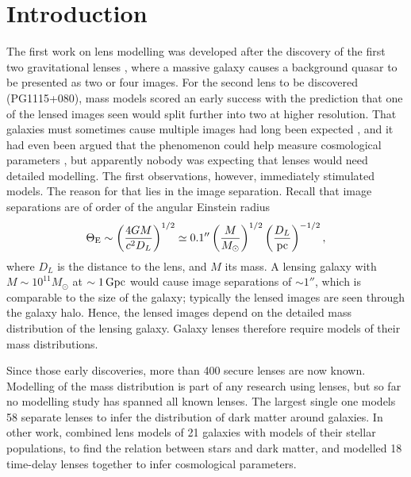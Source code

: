 \documentclass[usenatbib]{mn2e}
\begin{document}
\begin{keywords}
\end{keywords}


\section{Introduction}

The first work on lens modelling
\citep{1981ApJ...244..723Y,1981ApJ...244..736Y} was developed after
the discovery of the first two gravitational lenses
\citep{1979Natur.279..381W,1980Natur.285..641W}, where a massive
galaxy causes a background quasar to be presented as two or four
images.  For the second lens to be discovered (PG1115+080), mass
models scored an early success with the prediction that one of the
lensed images seen would split further into two at higher resolution.
That galaxies must sometimes cause multiple images had long been
expected \citep{1937ApJ....86..217Z}, and it had even been argued that
the phenomenon could help measure cosmological parameters
\citep{1964MNRAS.128..307R,1966MNRAS.132..101R}, but apparently nobody
was expecting that lenses would need detailed modelling.  The first
observations, however, immediately stimulated models.  The reason for
that lies in the image separation. Recall that image separations are
of order of the angular Einstein radius
\begin{equation}
\Theta_{\rm E}
\sim \left(\frac{4GM}{c^2 D_L}\right)^{1/2}
\simeq 0.1'' \left(\frac{M}{M_\odot}\right)^{1/2}
             \left(\frac{D_L}{\rm pc}\right)^{-1/2},
\end{equation}
where $D_L$ is the distance to the lens, and $M$ its mass.  A lensing
galaxy with $M\sim10^{11}M_\odot$ at $\sim1\rm\,Gpc$ would cause image
separations of $\sim1''$, which is comparable to the size of the
galaxy; typically the lensed images are seen through the galaxy halo.
Hence, the lensed images depend on the detailed mass distribution of
the lensing galaxy.  Galaxy lenses therefore require models of their
mass distributions.

Since those early discoveries, more than 400 secure lenses are now
known. Modelling of the mass distribution is part of any research
using lenses, but so far no modelling study has spanned all known
lenses.  The largest single one \citep{2009ApJ...703L..51K} models 58
separate lenses to infer the distribution of dark matter around
galaxies.  In other work, \cite{2011ApJ...740...97L} combined lens
models of 21 galaxies with models of their stellar populations, to
find the relation between stars and dark matter, and
\cite{2014MNRAS.437..600S} modelled 18 time-delay lenses together to
infer cosmological parameters.
\end{document}
